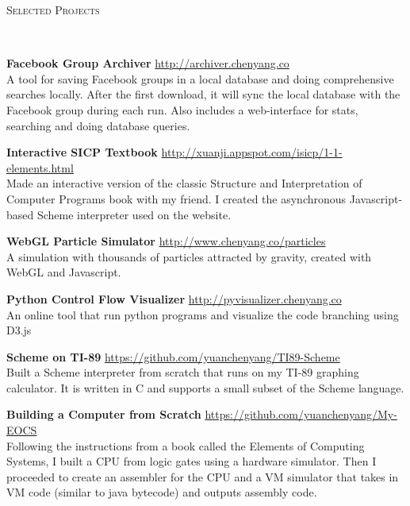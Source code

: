 \documentclass[9pt]{article}
\newenvironment{changemargin}[2]{%
  \begin{list}{}{%
      \setlength{\topsep}{0pt}%
      \setlength{\leftmargin}{#1}%
      \setlength{\rightmargin}{#2}%
      \setlength{\listparindent}{\parindent}%
      \setlength{\itemindent}{\parindent}%
      \setlength{\parsep}{\parskip}%
    }%
  \item[]}{\end{list}
}
\newcommand{\lineover}{
  \begin{changemargin}{-0.05in}{-0.05in}
    \vspace*{-8pt}
    \hrulefill \\
    \vspace*{-2pt}
  \end{changemargin}
}
\newcommand{\header}[1]{
  \begin{changemargin}{-0.5in}{-0.5in}
    \scshape{#1}\\
    \lineover
  \end{changemargin}
}
\newenvironment{body} {
  \vspace*{-16pt}
  \begin{changemargin}{-0.25in}{-0.5in}
  }
  {\end{changemargin}
}
\begin{document}
\smallskip

\header{Selected Projects}

\begin{body}
  \vspace{14pt}

  \textbf{Facebook Group Archiver} \hfill \url{http://archiver.chenyang.co}\\
  A tool for saving Facebook groups in a local database and doing comprehensive searches locally. After the first download, it will sync the local database with the Facebook group during each run. Also includes a web-interface for stats, searching and doing database queries. \\
  \medskip

  \textbf{Interactive SICP Textbook} \hfill \url{http://xuanji.appspot.com/isicp/1-1-elements.html}\\
  Made an interactive version of the classic Structure and Interpretation of Computer Programs book with my friend. I created the asynchronous Javascript-based Scheme interpreter used on the website.\\
  \medskip

  \textbf{WebGL Particle Simulator} \hfill \url{http://www.chenyang.co/particles}\\
  A simulation with thousands of particles attracted by gravity, created with WebGL and Javascript. \\
  \medskip

  \textbf{Python Control Flow Visualizer} \hfill \url{http://pyvisualizer.chenyang.co}\\
  An online tool that run python programs and visualize the code branching using D3.js\\
  \medskip

  \textbf{Scheme on TI-89} \hfill \url{https://github.com/yuanchenyang/TI89-Scheme}\\
  Built a Scheme interpreter from scratch that runs on my TI-89 graphing calculator. It is written in C and supports a small subset of the Scheme language.\\
  \medskip

  \textbf{Building a Computer from Scratch} \hfill \url{https://github.com/yuanchenyang/My-EOCS}\\
  Following the instructions from a book called the Elements of Computing Systems, I built a CPU from logic gates using a hardware simulator. Then I proceeded to create an assembler for the CPU and a VM simulator that takes in VM code (similar to java bytecode) and outputs assembly code. \\
  \medskip


\end{body}
\end{document}
